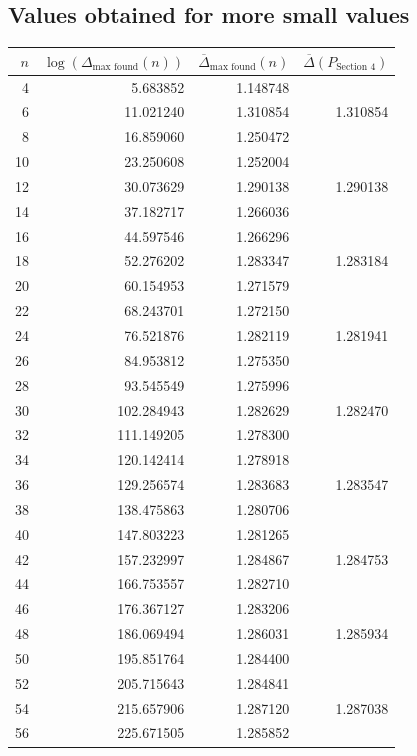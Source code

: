 \documentclass{article}
\theoremstyle{definition}
\begin{document}
\subsection{Values obtained for more small values}
\begin{center}
\begin{longtable}{rrrr}
\toprule
$n$ & $\log(\Delta_{\text{max found}}(n))$ & $\overline{\Delta}_{\text{max found}}(n)$ & $\overline{\Delta}(P_{\text{Section 4}})$  \\
\midrule
4 & 5.683852 & 1.148748 &  \\
6 & 11.021240 & 1.310854 & 1.310854 \\
8 & 16.859060 & 1.250472 &  \\
10 & 23.250608 & 1.252004 &  \\
12 & 30.073629 & 1.290138 & 1.290138 \\
14 & 37.182717 & 1.266036 &  \\
16 & 44.597546 & 1.266296 &  \\
18 & 52.276202 & 1.283347 & 1.283184 \\
20 & 60.154953 & 1.271579 &  \\
22 & 68.243701 & 1.272150 &  \\
24 & 76.521876 & 1.282119 & 1.281941 \\
26 & 84.953812 & 1.275350 &  \\
28 & 93.545549 & 1.275996 &  \\
30 & 102.284943 & 1.282629 & 1.282470 \\
32 & 111.149205 & 1.278300 &  \\
34 & 120.142414 & 1.278918 &  \\
36 & 129.256574 & 1.283683 & 1.283547 \\
38 & 138.475863 & 1.280706 &  \\
40 & 147.803223 & 1.281265 &  \\
42 & 157.232997 & 1.284867 & 1.284753 \\
44 & 166.753557 & 1.282710 &  \\
46 & 176.367127 & 1.283206 &  \\
48 & 186.069494 & 1.286031 & 1.285934 \\
50 & 195.851764 & 1.284400 &  \\
52 & 205.715643 & 1.284841 &  \\
54 & 215.657906 & 1.287120 & 1.287038 \\
56 & 225.671505 & 1.285852 &  \\

\end{longtable}
\end{center}
\end{document}
